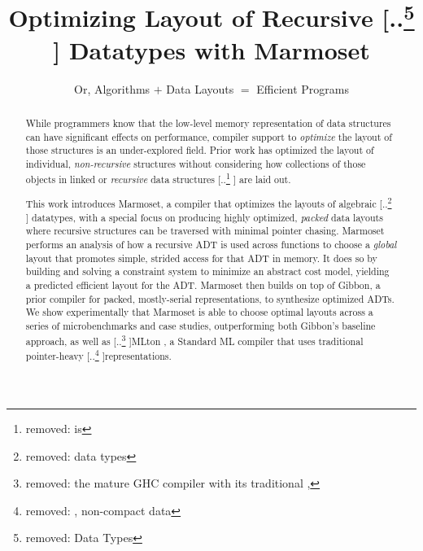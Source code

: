 \documentclass[acmsmall,review,anonymous]{acmart}\settopmatter{printfolios=true,printccs=false,printacmref=false}
\newcommand{\system}{{\sc Marmoset}\xspace}
\newcommand{\gibbon}{{\sc Gibbon}\xspace}
\newcommand{\mlton}{{\sc MLton}\xspace} %
\providecommand{\DIFaddtex}[1]{{\protect\color{blue} \sf #1}} %
\providecommand{\DIFdeltex}[1]{{\protect\color{red} [..\footnote{removed: #1} ]}} %
\providecommand{\DIFaddbegin}{} %
\providecommand{\DIFaddend}{} %
\providecommand{\DIFdelbegin}{} %
\providecommand{\DIFdelend}{} %
\providecommand{\DIFadd}[1]{\texorpdfstring{\DIFaddtex{#1}}{#1}} %
\providecommand{\DIFdel}[1]{\texorpdfstring{\DIFdeltex{#1}}{}} %
\newcommand{\DIFscaledelfig}{0.5}
\newlength{\DIFdelgraphicswidth} %
\newlength{\DIFdelgraphicsheight} %
\newcommand{\DIFaddincludegraphics}[2][]{{\color{blue}\fbox{\DIFOincludegraphics[#1]{#2}}}} %
\newcommand{\DIFdelincludegraphics}[2][]{%
\sbox{\DIFdelgraphicsbox}{\DIFOincludegraphics[#1]{#2}}%
\settoboxwidth{\DIFdelgraphicswidth}{\DIFdelgraphicsbox} %
\settoboxtotalheight{\DIFdelgraphicsheight}{\DIFdelgraphicsbox} %
\scalebox{\DIFscaledelfig}{%
\parbox[b]{\DIFdelgraphicswidth}{\usebox{\DIFdelgraphicsbox}\\[-\baselineskip] \rule{\DIFdelgraphicswidth}{0em}}\llap{\resizebox{\DIFdelgraphicswidth}{\DIFdelgraphicsheight}{%
\setlength{\unitlength}{\DIFdelgraphicswidth}%
\begin{picture}(1,1)%
\thicklines\linethickness{2pt} %
{\color[rgb]{1,0,0}\put(0,0){\framebox(1,1){}}}%
{\color[rgb]{1,0,0}\put(0,0){\line( 1,1){1}}}%
{\color[rgb]{1,0,0}\put(0,1){\line(1,-1){1}}}%
\end{picture}%
}\hspace*{3pt}}} %
} %
\DeclareRobustCommand{\DIFaddbegin}{\DIFOaddbegin \let\includegraphics\DIFaddincludegraphics} %
\DeclareRobustCommand{\DIFaddend}{\DIFOaddend \let\includegraphics\DIFOincludegraphics} %
\DeclareRobustCommand{\DIFdelbegin}{\DIFOdelbegin \let\includegraphics\DIFdelincludegraphics} %
\DeclareRobustCommand{\DIFdelend}{\DIFOaddend \let\includegraphics\DIFOincludegraphics} %
\begin{document}
\title{Optimizing Layout of Recursive \DIFdelbegin \DIFdel{Data Types }\DIFdelend \DIFaddbegin \DIFadd{Datatypes }\DIFaddend with Marmoset}
\subtitle{Or, Algorithms ${+}$ Data Layouts ${=}$ Efficient Programs}



























\begin{abstract}


While programmers know that the low-level memory representation of data structures can have significant effects 
on performance, compiler support to {\em optimize} the layout of those structures is an under-explored field.
Prior work has optimized the layout of individual, \textit{non-recursive} structures without considering how
collections of those objects in linked or \textit{recursive} data structures \DIFdelbegin \DIFdel{is }\DIFdelend \DIFaddbegin \DIFadd{are }\DIFaddend laid out.




This work introduces \system, a compiler that optimizes the layouts of algebraic \DIFdelbegin \DIFdel{data types}\DIFdelend \DIFaddbegin \DIFadd{datatypes}\DIFaddend , with a special focus
on producing highly optimized, {\em packed} data layouts where recursive structures can be traversed with minimal
pointer chasing. \system performs an analysis of how a recursive ADT is used across functions to choose a \textit{global} layout
that promotes simple, strided access for that ADT in memory. It does so by building and solving a constraint system
to minimize an abstract cost model, yielding a predicted efficient layout for the ADT. \system then builds on top
of \gibbon, a prior compiler for packed, mostly-serial representations, to synthesize optimized ADTs. We show experimentally 
that \system is able to choose optimal layouts across a series of microbenchmarks and case studies, outperforming both 
\gibbon's baseline approach, as well as \DIFdelbegin \DIFdel{the mature GHC compiler with its traditional
, }\DIFdelend \DIFaddbegin \mlton\DIFadd{, a Standard ML compiler that uses traditional
}\DIFaddend pointer-heavy \DIFdelbegin \DIFdel{, non-compact data }\DIFdelend representations.




\end{abstract}
 \maketitle
\end{document}
